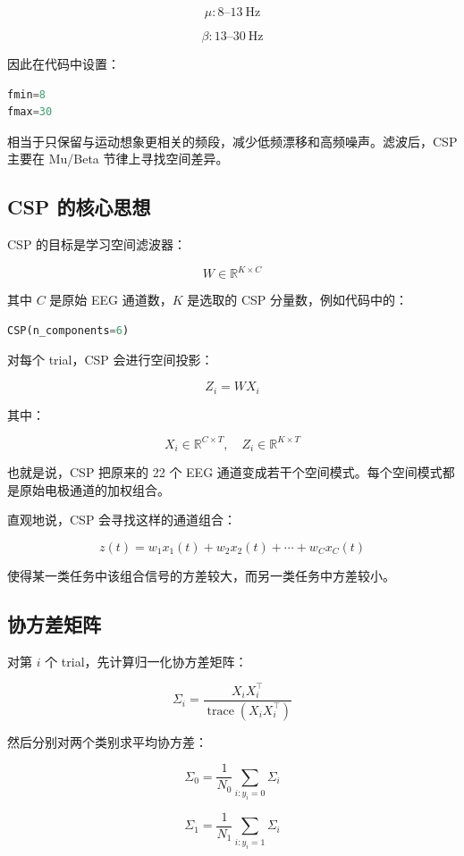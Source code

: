 \documentclass[UTF8,a4paper,12pt]{ctexart}
\begin{document}
\[
\mu: 8\text{--}13~\mathrm{Hz}
\]

\[
\beta: 13\text{--}30~\mathrm{Hz}
\]

因此在代码中设置：

\begin{lstlisting}[language=Python]
fmin=8
fmax=30
\end{lstlisting}

相当于只保留与运动想象更相关的频段，减少低频漂移和高频噪声。滤波后，CSP 主要在 Mu/Beta 节律上寻找空间差异。

\subsection{CSP 的核心思想}

CSP 的目标是学习空间滤波器：

\[
W \in \mathbb{R}^{K \times C}
\]

其中 \(C\) 是原始 EEG 通道数，\(K\) 是选取的 CSP 分量数，例如代码中的：

\begin{lstlisting}[language=Python]
CSP(n_components=6)
\end{lstlisting}

对每个 trial，CSP 会进行空间投影：

\[
Z_i = W X_i
\]

其中：

\[
X_i \in \mathbb{R}^{C \times T}, \quad Z_i \in \mathbb{R}^{K \times T}
\]

也就是说，CSP 把原来的 22 个 EEG 通道变成若干个空间模式。每个空间模式都是原始电极通道的加权组合。

直观地说，CSP 会寻找这样的通道组合：

\[
z(t) = w_1 x_1(t) + w_2 x_2(t) + \cdots + w_C x_C(t)
\]

使得某一类任务中该组合信号的方差较大，而另一类任务中方差较小。

\subsection{协方差矩阵}

对第 \(i\) 个 trial，先计算归一化协方差矩阵：

\[
\Sigma_i = \frac{X_i X_i^\top}{\operatorname{trace}(X_i X_i^\top)}
\]

然后分别对两个类别求平均协方差：

\[
\Sigma_0 = \frac{1}{N_0} \sum_{i:y_i=0} \Sigma_i
\]

\[
\Sigma_1 = \frac{1}{N_1} \sum_{i:y_i=1} \Sigma_i
\]
\end{document}
